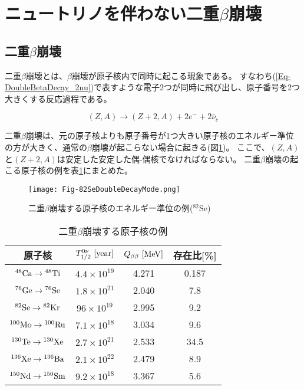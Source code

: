 \documentclass[a4paper,10pt]{jreport}
\begin{document}
\section{ニュートリノを伴わない二重$\beta$崩壊}




\subsection{二重$\beta$崩壊}

二重$\beta$崩壊とは、$\beta$崩壊が原子核内で同時に起こる現象である。
すなわち(\ref{Eq-DoubleBetaDecay_2nu})で表すような電子2つが同時に飛び出し、原子番号を2つ大きくする反応過程である。

\begin{equation} \label{Eq-DoubleBetaDecay_2nu}
	(Z,A)\to(Z+2,A)+2e^-+2\bar{\nu}_e
\end{equation}

二重$\beta$崩壊は、元の原子核よりも原子番号が1つ大きい原子核のエネルギー準位の方が大きく、通常の$\beta$崩壊が起こらない場合に起きる(図\ref{Fig-82SeDoubleDecayMode})。
ここで、$(Z,A)$と$(Z+2,A)$は安定した安定した偶-偶核でなければならない。
二重$\beta$崩壊の起こる原子核の例を表\ref{Tab-82SeDoubleDecayTable}にまとめた。

\begin{figure}[H]
	\center
	\texttt{[image: Fig-82SeDoubleDecayMode.png]}
	\caption{二重$\beta$崩壊する原子核のエネルギー準位の例($^{82}$Se)} \label{Fig-82SeDoubleDecayMode}
\end{figure}

\begin{table}[H] 
	\center
	\caption{二重$\beta$崩壊する原子核の例\cite{Syuron_2011}} \label{Tab-82SeDoubleDecayTable}
	\begin{tabular}{cccc}
		\hline
		原子核 & $T_{1/2}^{0\nu}\ [\rm{year}]$ & $Q_{\beta\beta}\ [\rm{MeV}]$ & 存在比[\%] \\
		\hline
		$\rm{{^{48}Ca} \to {^{48}Ti}}$ & $4.4\times 10^{19}$ & 4.271 & 0.187 \\
		$\rm{{^{76}Ge} \to {^{76}Se}}$ & $1.8\times 10^{21}$ & 2.040 & 7.8 \\
		$\rm{{^{82}Se} \to {^{82}Kr}}$ & $96\times 10^{19}$ & 2.995 & 9.2 \\
		$\rm{{^{100}Mo} \to {^{100}Ru}}$ & $7.1\times 10^{18}$ & 3.034 & 9.6 \\
		$\rm{{^{130}Te} \to {^{130}Xe}}$ & $2.7\times 10^{21}$ & 2.533 & 34.5 \\
		$\rm{{^{136}Xe} \to {^{136}Ba}}$ & $2.1\times 10^{22}$ & 2.479 & 8.9 \\
		$\rm{{^{150}Nd} \to {^{150}Sm}}$ & $9.2\times 10^{18}$ & 3.367 & 5.6 \\
		\hline
	\end{tabular}
\end{table}
\end{document}
